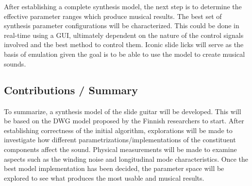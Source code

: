 \documentclass[12pt]{article}
\providecommand{\DIFadd}[1]{{\protect\color{blue}\uwave{#1}}} %
\providecommand{\DIFaddbegin}{} %
\providecommand{\DIFaddend}{} %
\begin{document}
After establishing a complete synthesis model, the next step is to determine the effective parameter ranges which produce musical results. The best set of synthesis parameter configurations will be characterized. This could be done in real-time using a GUI, ultimately dependent on the nature of the control signals involved and the best method to control them. Iconic slide licks will serve as the basis of emulation given \DIFaddbegin \DIFadd{that }\DIFaddend the goal is to be able to use the model to create musical sounds.

\subsection*{Contributions / Summary}
\paragraph{}
To summarize, a synthesis model of the slide guitar will be developed. This will be based on the DWG model proposed by the Finnish researchers to start. After establishing correctness of the initial algorithm, explorations will be made to investigate how different parametrizations/implementations of the constituent components affect the sound. Physical measurements will be made to examine aspects such as the winding noise and longitudinal mode characteristics. Once the best model implementation has been decided, the parameter space will be explored to see what produces the most usable and musical results.

\clearpage


\end{document}
